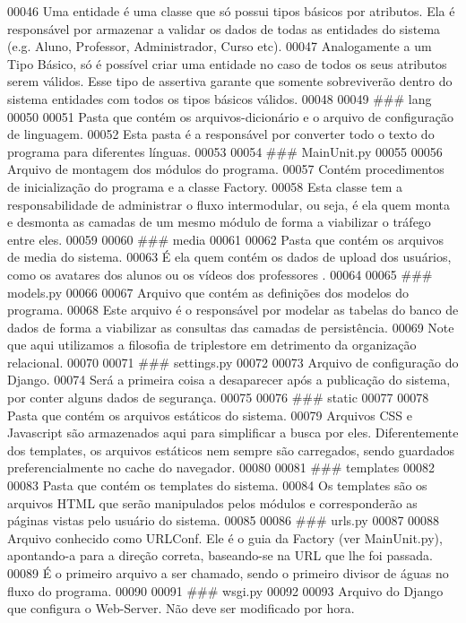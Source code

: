 \begin{DoxyCode}
00046 Uma entidade é uma classe que só possui tipos básicos por atributos. Ela é responsável por armazenar a 
      validar os dados de todas as entidades \textcolor{keywordflow}{do} sistema (e.g. Aluno, Professor, Administrador, Curso etc).
00047 Analogamente a um Tipo Básico, só é possível criar uma entidade no caso de todos os seus atributos serem 
      válidos. Esse tipo de assertiva garante que somente sobreviverão dentro \textcolor{keywordflow}{do} sistema entidades com todos os 
      tipos básicos válidos.
00048 
00049 ### lang
00050 
00051 Pasta que contém os arquivos-dicionário e o arquivo de configuração de linguagem.
00052 Esta pasta é a responsável por converter todo o texto \textcolor{keywordflow}{do} programa para diferentes línguas.
00053 
00054 ### MainUnit.py
00055 
00056 Arquivo de montagem dos módulos \textcolor{keywordflow}{do} programa.
00057 Contém procedimentos de inicialização \textcolor{keywordflow}{do} programa e a classe Factory.
00058 Esta classe tem a responsabilidade de administrar o fluxo intermodular, ou seja, é ela quem monta e 
      desmonta as camadas de um mesmo módulo de forma a viabilizar o tráfego entre eles.
00059 
00060 ### media
00061 
00062 Pasta que contém os arquivos de media \textcolor{keywordflow}{do} sistema.
00063 É ela quem contém os dados de upload dos usuários, como os avatares dos alunos ou os vídeos dos professores
      .
00064 
00065 ### models.py
00066 
00067 Arquivo que contém as definições dos modelos \textcolor{keywordflow}{do} programa.
00068 Este arquivo é o responsável por modelar as tabelas \textcolor{keywordflow}{do} banco de dados de forma a viabilizar as consultas 
      das camadas de persistência.
00069 Note que aqui utilizamos a filosofia de triplestore em detrimento da organização relacional.
00070 
00071 ### settings.py
00072 
00073 Arquivo de configuração \textcolor{keywordflow}{do} Django.
00074 Será a primeira coisa a desaparecer após a publicação \textcolor{keywordflow}{do} sistema, por conter alguns dados de segurança.
00075 
00076 ### \textcolor{keyword}{static}
00077 
00078 Pasta que contém os arquivos estáticos \textcolor{keywordflow}{do} sistema.
00079 Arquivos CSS e Javascript são armazenados aqui para simplificar a busca por eles. Diferentemente dos 
      templates, os arquivos estáticos nem sempre são carregados, sendo guardados preferencialmente no cache \textcolor{keywordflow}{do} 
      navegador.
00080 
00081 ### templates
00082 
00083 Pasta que contém os templates \textcolor{keywordflow}{do} sistema.
00084 Os templates são os arquivos HTML que serão manipulados pelos módulos e corresponderão as páginas vistas 
      pelo usuário \textcolor{keywordflow}{do} sistema.
00085 
00086 ### urls.py
00087 
00088 Arquivo conhecido como URLConf. Ele é o guia da Factory (ver MainUnit.py), apontando-a para a direção 
      correta, baseando-se na URL que lhe foi passada.
00089 É o primeiro arquivo a ser chamado, sendo o primeiro divisor de águas no fluxo \textcolor{keywordflow}{do} programa.
00090 
00091 ### wsgi.py
00092 
00093 Arquivo \textcolor{keywordflow}{do} Django que configura o Web-Server. Não deve ser modificado por hora.
\end{DoxyCode}
